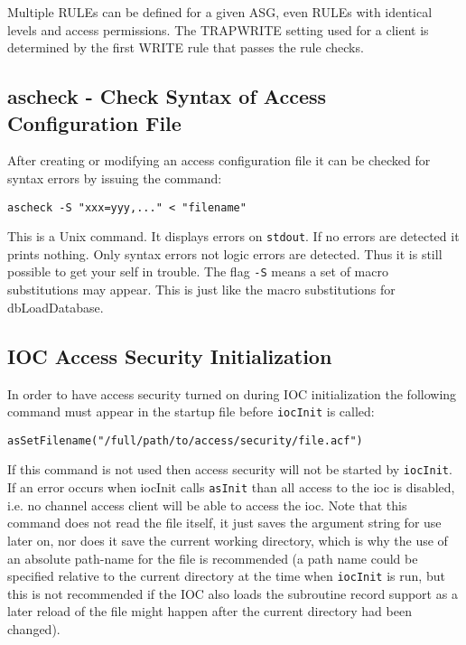 Multiple RULEs can be defined for a given ASG, even RULEs with identical levels and access permissions.
The TRAPWRITE setting used for a client is determined by the first WRITE rule that passes the rule checks.

\subsection{ascheck - Check Syntax of Access Configuration File}

After creating or modifying an access configuration file it can be checked for syntax errors by issuing the command:

\begin{verbatim}
ascheck -S "xxx=yyy,..." < "filename"
\end{verbatim}

This is a Unix command. It displays errors on \verb|stdout|. If no errors are detected it prints nothing. Only syntax errors not 
logic errors are detected. Thus it is still possible to get your self in trouble. The flag \verb|-S| means a set of macro 
substitutions may appear. This is just like the macro substitutions for dbLoadDatabase.

\subsection{IOC Access Security Initialization}

In order to have access security turned on during IOC initialization the following command must appear in the startup file 
before \verb|iocInit| is called:

\begin{verbatim}
asSetFilename("/full/path/to/access/security/file.acf")
\end{verbatim}

If this command is not used then access security will not be started by \verb|iocInit|. If an error occurs when iocInit calls 
\verb|asInit| than all access to the ioc is disabled, i.e. no channel access client will be able to access the ioc. Note that this 
command does not read the file itself, it just saves the argument string for use later on, nor does it save the current 
working directory, which is why the use of an absolute path-name for the file is recommended (a path name could be 
specified relative to the current directory at the time when \verb|iocInit| is run, but this is not recommended if the IOC also 
loads the subroutine record support as a later reload of the file might happen after the current directory had been changed).

